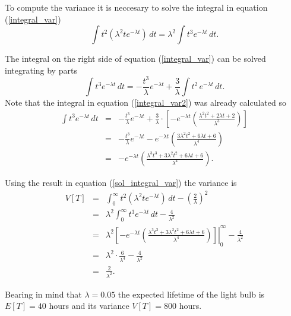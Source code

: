 \documentclass[12pt]{article}
\begin{document}
	To compute the variance it is neccesary to solve the integral in equation (\ref{integral_var})
	\begin{equation}
	\int t^2 \left( \lambda^2 t e^{-\lambda t} \right) \, dt = \lambda^2 \int t^3e^{-\lambda t} \, dt.
	\label{integral_var}
	\end{equation}
	
	The integral on the right side of equation (\ref{integral_var}) can be solved integrating by parts
	\begin{equation}
	\int t^3e^{-\lambda t} \, dt = -\frac{t^3}{\lambda}e^{-\lambda t} + \frac{3}{\lambda} \int t^2 \, e^{-\lambda t}\, dt.
	\label{integral_var2}
	\end{equation}
	Note that the integral in equation (\ref{integral_var2}) was already calculated so
	\begin{eqnarray}
	\int t^3e^{-\lambda t} \, dt &=& -\frac{t^3}{\lambda}e^{-\lambda t} + \frac{3}{\lambda} \cdot \left[- e^{-\lambda t} \left( \frac{\lambda^2 t^2 + 2\lambda t + 2}{\lambda^3} \right) \right] \nonumber \\
	&=& -\frac{t^3}{\lambda}e^{-\lambda t} - e^{-\lambda t} \left( \frac{3\lambda^2 t^2 + 6\lambda t + 6}{\lambda^4} \right) \nonumber \\
	&=& - e^{-\lambda t} \left( \frac{\lambda^3t^3 + 3\lambda^2 t^2 + 6\lambda t + 6}{\lambda^4} \right).
	\label{sol_integral_var}
	\end{eqnarray}
	
	Using the result in equation (\ref{sol_integral_var}) the variance is
	\begin{eqnarray*}
	V[T] &=& \int_{0}^{\infty} t^2 \left( \lambda^2 t e^{-\lambda t} \right) \, dt - \left(\frac{2}{\lambda}\right)^2 \\
	&=& \lambda^2 \int_{0}^{\infty} t^3e^{-\lambda t} \, dt - \frac{4}{\lambda^2} \\
	&=& \lambda^2 \left. \left[- e^{-\lambda t} \left( \frac{\lambda^3t^3 + 3\lambda^2 t^2 + 6\lambda t + 6}{\lambda^4} \right)\right] \right|_{0}^{\infty} - \frac{4}{\lambda^2} \\
	&=& \lambda^2 \cdot \frac{6}{\lambda^4} - \frac{4}{\lambda^2}\\ 
	&=& \frac{2}{\lambda^2}.
	\end{eqnarray*}

	Bearing in mind that $\lambda=0.05$ the expected lifetime of the light bulb is $E[T] = 40$ hours and its variance $V[T] = 800$ hours.
	


\end{document}
